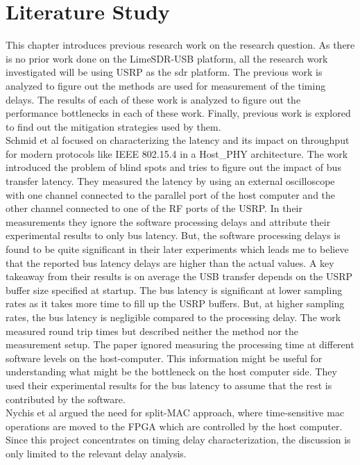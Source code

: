\chapter{Literature Study}

This chapter introduces previous research work on the research question.
As there is no prior work done on the LimeSDR-USB platform, all the research work investigated will be using USRP as the \ac{sdr} platform.
The previous work is analyzed to figure out the methods are used for measurement of the timing delays.
The results of each of these work is analyzed to figure out the performance bottlenecks in each of these work.
Finally, previous work is explored to find out the mitigation strategies used by them.\\

Schmid et al \cite{schmid_experimental_2007} focused on characterizing the latency and its impact on throughput for modern protocols like IEEE 802.15.4 in a Host\_PHY architecture.
The work introduced the problem of blind spots and tries to figure out the impact of bus transfer latency.
They measured the latency by using an external oscilloscope with one channel connected to the parallel port of the host computer and the other channel connected to one of the RF ports of the USRP.
In their measurements they ignore the software processing delays and attribute their experimental results to only bus latency.
But, the software processing delays is found to be quite significant in their later experiments which leads me to believe that the reported bus latency delays are higher than the actual values.
A key takeaway from their results is on average the USB transfer depends on the USRP buffer size specified at startup.
The bus latency is significant at lower sampling rates as it takes more time to fill up the USRP buffers.
But, at higher sampling rates, the bus latency is negligible compared to the processing delay.
The work measured round trip times but described neither the method nor the measurement setup.
The paper ignored measuring the processing time at different software levels on the host-computer.
This information might be useful for understanding what might be the bottleneck on the host computer side.
They used their experimental results for the bus latency to assume that the rest is contributed by the software.\\

Nychis et al \cite{nychis_enabling_nodate} argued the need for split-MAC approach, where time-sensitive \ac{mac} operations are moved to the \ac{FPGA} which are controlled by the host computer.
Since this project concentrates on timing delay characterization, the discussion is only limited to the relevant delay analysis.\\

